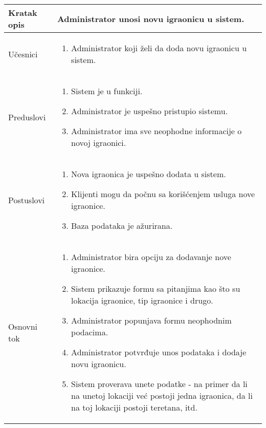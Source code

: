 \documentclass[../main.tex]{subfiles}
\begin{document}
\begin{longtable}{| p{} | p{} |} 

\hline
    Kratak opis &  Administrator unosi novu igraonicu u sistem. \\ 
\hline    
    Učesnici & 
    	\begin{enumerate}
        \item Administrator koji želi da doda novu igraonicu u sistem.
     \end{enumerate}\\
\hline
   Preduslovi & \begin{enumerate}
       \item Sistem je u funkciji.
        \item Administrator je uspešno pristupio sistemu.
       \item Administrator ima sve neophodne informacije o novoj igraonici.
   \end{enumerate}\\
\hline  
    Postuslovi & \begin{enumerate}
        \item Nova igraonica je uspešno dodata u sistem.
        \item Klijenti mogu da počnu sa korišćenjem usluga nove igraonice.
        \item Baza podataka je ažurirana.
    \end{enumerate}\\
\hline
    Osnovni tok & \begin{enumerate}
        \item Administrator bira opciju za dodavanje nove igraonice.
        \item Sistem prikazuje formu sa pitanjima kao što su lokacija igraonice, tip igraonice i drugo.
        \item Administrator popunjava formu neophodnim podacima.
        \item Administrator potvrđuje unos podataka i dodaje novu igraonicu. %
        \item Sistem proverava unete podatke - na primer da li na unetoj lokaciji već postoji jedna igraonica, da li na toj lokaciji postoji teretana, itd. %

\end{enumerate}
\end{longtable}
\end{document}

